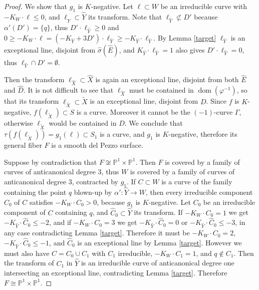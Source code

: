 \documentclass[a4paper,12pt]{amsart}
\theoremstyle{definition}
\numberwithin{figure}{section}
\numberwithin{table}{section}
\newcommand{\ph}{\varphi}
\newcommand{\w}{\widetilde}
\newcommand{\wi}{\widehat}
\newcommand{\pr}{\mathbb{P}}
\newcommand{\dom}{\operatorname{dom}}
\begin{document}
\begin{proof}
We show that $g_1$ is $K$-negative. Let $\ell\subset W$ be an irreducible curve with $-K_W\cdot\ell\leq 0$, and $\ell_{\wi{Y}}\subset\wi{Y}$ its transform.
Note that $\ell_{\wi{Y}}\not\subset D'$ because $\alpha'(D')=\{q\}$, thus $D'\cdot\ell_{\wi{Y}}\geq 0$ and
$0\geq -K_W\cdot\ell=(-K_{\wi{Y}}+3D')\cdot\ell_{\wi{Y}}\geq -K_{\wi{Y}}\cdot\ell_{\wi{Y}}$.
By Lemma \ref{target} $\ell_{\wi{Y}}$ is an exceptional line, disjoint from $\hat{\sigma}(\wi{E})$, and $K_{\wi{Y}}\cdot\ell_{\wi{Y}}=1$ also gives $D'\cdot\ell_{\wi{Y}}= 0$,
thus $\ell_{\wi{Y}}\cap D'=\emptyset$.

 Then
 the transform $\ell_{\wi{X}}\subset\wi{X}$ is again an exceptional line,
disjoint from both 
 $\wi{E}$ and $\wi{D}$.
It is not difficult to see that $\ell_{\wi{X}}$ must be contained in $\dom(\ph^{-1})$, so that its transform $\ell_{\w{X}}\subset\w{X}$ 
is an exceptional line, disjoint from $D$. Since $f$ is $K$-negative, $f(\ell_{\w{X}})\subset S$ is a curve. Moreover it cannot be the $(-1)$-curve $\Gamma$, otherwise $\ell_{\w{X}}$ would be contained in $D$. We conclude that $\tau(f(\ell_{\w{X}}))=g_1(\ell)\subset S_1$ is a curve, and $g_1$ is $K$-negative, therefore its general fiber
$F$ is a smooth del Pezzo surface.

Suppose by contradiction that $F\not\cong\pr^1\times\pr^1$. Then $F$ is covered by a family of curves of anticanonical degree $3$, thus $W$ is covered by a family of curves of anticanonical degree $3$, contracted by $g_1$. If $C\subset W$ is a curve of the family containing the point $q$ blown-up by $\alpha'\colon\wi{Y}\to W$, then every irreducible component $C_0$ of $C$ satisfies $-K_W\cdot C_0>0$, because $g_1$ is $K$-negative.
Let $C_0$ be an irreducible component of $C$ containing $q$, and
$\wi{C}_0\subset\wi{Y}$ its transform.
If $-K_W\cdot C_0=1$ we get $-K_{\wi{Y}}\cdot\wi{C}_0\leq -2$, and if $-K_W\cdot C_0=3$ we get  $-K_{\wi{Y}}\cdot\wi{C}_0=0$ or $-K_{\wi{Y}}\cdot\wi{C}_0\leq -3$,
in any case 
contradicting Lemma \ref{target}. Therefore it must be  $-K_W\cdot C_0=2$, $-K_{\wi{Y}}\cdot\wi{C}_0\leq -1$, and
 $\wi{C}_0$ is an exceptional line by Lemma \ref{target}. However we must also have $C=C_0\cup C_1$ with $C_1$ irreducible, $-K_W\cdot C_1=1$, and $q\not\in C_1$. Then the transform of $C_1$ in $\wi{Y}$ is an irreducible curve of anticanonical degree one intersecting an exceptional line, contradicting 
Lemma \ref{target}.
Therefore $F\cong\pr^1\times\pr^1$.
\end{proof}
\end{document}
